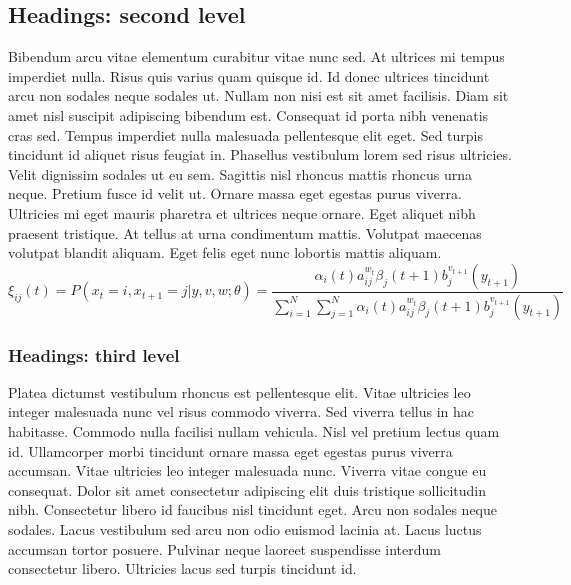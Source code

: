 \subsection{Headings: second level}
Bibendum arcu vitae elementum curabitur vitae nunc sed. At ultrices mi tempus imperdiet nulla. Risus quis varius quam quisque id. Id donec ultrices tincidunt arcu non sodales neque sodales ut. Nullam non nisi est sit amet facilisis. Diam sit amet nisl suscipit adipiscing bibendum est. Consequat id porta nibh venenatis cras sed. Tempus imperdiet nulla malesuada pellentesque elit eget. Sed turpis tincidunt id aliquet risus feugiat in. Phasellus vestibulum lorem sed risus ultricies. Velit dignissim sodales ut eu sem. Sagittis nisl rhoncus mattis rhoncus urna neque. Pretium fusce id velit ut. Ornare massa eget egestas purus viverra. Ultricies mi eget mauris pharetra et ultrices neque ornare. Eget aliquet nibh praesent tristique. At tellus at urna condimentum mattis. Volutpat maecenas volutpat blandit aliquam. Eget felis eget nunc lobortis mattis aliquam.
\begin{equation}
	\xi _{ij}(t)=P(x_{t}=i,x_{t+1}=j|y,v,w;\theta)= {\frac {\alpha _{i}(t)a^{w_t}_{ij}\beta _{j}(t+1)b^{v_{t+1}}_{j}(y_{t+1})}{\sum _{i=1}^{N} \sum _{j=1}^{N} \alpha _{i}(t)a^{w_t}_{ij}\beta _{j}(t+1)b^{v_{t+1}}_{j}(y_{t+1})}}
\end{equation}

\subsubsection{Headings: third level}
Platea dictumst vestibulum rhoncus est pellentesque elit. Vitae ultricies leo integer malesuada nunc vel risus commodo viverra. Sed viverra tellus in hac habitasse. Commodo nulla facilisi nullam vehicula. Nisl vel pretium lectus quam id. Ullamcorper morbi tincidunt ornare massa eget egestas purus viverra accumsan. Vitae ultricies leo integer malesuada nunc. Viverra vitae congue eu consequat. Dolor sit amet consectetur adipiscing elit duis tristique sollicitudin nibh. Consectetur libero id faucibus nisl tincidunt eget. Arcu non sodales neque sodales. Lacus vestibulum sed arcu non odio euismod lacinia at. Lacus luctus accumsan tortor posuere. Pulvinar neque laoreet suspendisse interdum consectetur libero. Ultricies lacus sed turpis tincidunt id.

